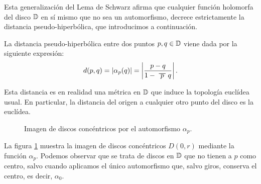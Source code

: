 Esta generalización del Lema de Schwarz afirma que cualquier función holomorfa del disco $\mathbb{D}$ en sí mismo que no sea un automorfismo, decrece estrictamente la distancia pseudo-hiperbólica, que introducimos a continuación. \\

\begin{definition}
    La distancia pseudo-hiperbólica entre dos puntos $p, q \in \mathbb{D}$ viene dada por la siguiente expresión:
    \begin{equation*}
        d(p,q) = \abs{\alpha_p(q)} = \abs{\frac{p-q}{1 - \xbar{p} q}}.
    \end{equation*}
\end{definition}

Esta distancia es en realidad una métrica en $\mathbb{D}$ que induce la topología euclídea usual. En particular, la distancia del origen a cualquier otro punto del disco es la euclídea. \\

\begin{figure}[h]{}
    \begin{minipage}[h]{0.5\textwidth}
        \centering
        \label{fig:circulos1}
    \end{minipage} \hfill
     \begin{minipage}[h]{0.5\textwidth}
        \centering
        \label{fig:circulos2}
    \end{minipage}
    \caption{Imagen de discos concéntricos por el automorfismo $\alpha_p$.}
    \label{fig:automorfismo}
\end{figure}

La figura \ref{fig:automorfismo} muestra la imagen de discos concéntricos $D(0,r)$ mediante la función $\alpha_p$. Podemos observar que se trata de discos en $\mathbb{D}$ que no tienen a $p$ como centro, salvo cuando aplicamos el único automorfismo que, salvo giros, conserva el centro, es decir, $\alpha_0$. \\

